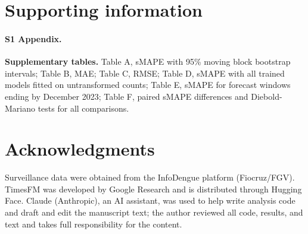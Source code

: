 \documentclass[10pt,letterpaper]{article}
\begin{document}
\section*{Supporting information}

\paragraph*{S1 Appendix.}
\label{S1_Appendix}
\textbf{Supplementary tables.} Table A, sMAPE with 95\% moving block bootstrap intervals; Table B, MAE; Table C, RMSE; Table D, sMAPE with all trained models fitted on untransformed counts; Table E, sMAPE for forecast windows ending by December 2023; Table F, paired sMAPE differences and Diebold-Mariano tests for all  comparisons.

\section*{Acknowledgments}
Surveillance data were obtained from the InfoDengue platform (Fiocruz/FGV). TimesFM was developed by Google Research and is distributed through Hugging Face. Claude (Anthropic), an AI assistant, was used to help write analysis code and draft and edit the manuscript text; the author reviewed all code, results, and text and takes full responsibility for the content.

\nolinenumbers


\end{document}
